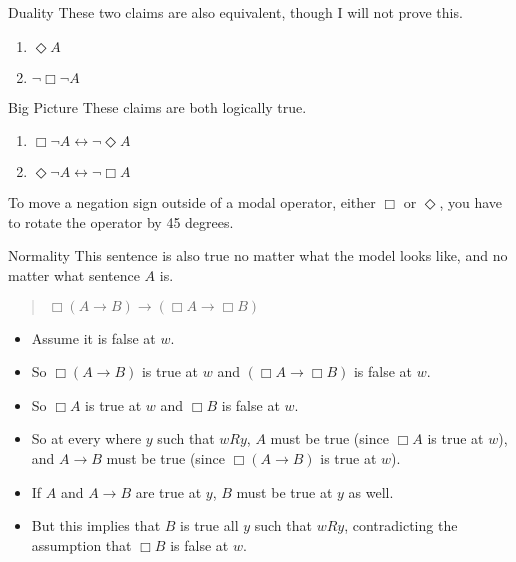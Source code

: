 \documentclass[
  14pt,
  letterpaper,
  ignorenonframetext,
  aspectratio=169,
  handout]{beamer}
\providecommand{\tightlist}{%
  \setlength{\itemsep}{0pt}\setlength{\parskip}{0pt}}\usepackage{longtable,booktabs,array}
\begin{document}
\begin{frame}{Duality}
\protect\hypertarget{duality-2}{}
These two claims are also equivalent, though I will not prove this.

\begin{enumerate}[<+->]
\tightlist
\item
  \(\Diamond A\)
\item
  \(\neg \Box \neg A\)
\end{enumerate}
\end{frame}

\begin{frame}{Big Picture}
\protect\hypertarget{big-picture}{}
These claims are both logically true.

\begin{enumerate}[<+->]
\tightlist
\item
  \(\Box \neg A \leftrightarrow \neg \Diamond A\)
\item
  \(\Diamond \neg A \leftrightarrow \neg \Box A\)
\end{enumerate}

To move a negation sign outside of a modal operator, either \(\Box\) or
\(\Diamond\), you have to rotate the operator by 45 degrees.
\end{frame}

\begin{frame}{Normality}
\protect\hypertarget{normality}{}
This sentence is also true no matter what the model looks like, and no
matter what sentence \(A\) is.

\begin{quote}
\(\Box (A \rightarrow B) \rightarrow (\Box A \rightarrow \Box B)\)
\end{quote}

\begin{itemize}[<+->]
\tightlist
\item
  Assume it is false at \(w\).
\item
  So \(\Box (A \rightarrow B)\) is true at \(w\) and
  \((\Box A \rightarrow \Box B)\) is false at \(w\).
\item
  So \(\Box A\) is true at \(w\) and \(\Box B\) is false at \(w\).
\item
  So at every where \(y\) such that \(wRy\), \(A\) must be true (since
  \(\Box A\) is true at \(w\)), and \(A \rightarrow B\) must be true
  (since \(\Box(A \rightarrow B)\) is true at \(w\)).
\item
  If \(A\) and \(A \rightarrow B\) are true at \(y\), \(B\) must be true
  at \(y\) as well.
\item
  But this implies that \(B\) is true all \(y\) such that \(wRy\),
  contradicting the assumption that \(\Box B\) is false at \(w\).
\end{itemize}
\end{frame}
\end{document}
